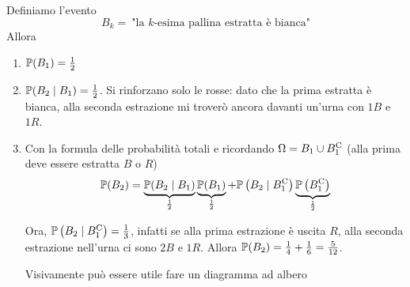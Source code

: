 Definiamo l'evento
\begin{equation*}
B_{k} =\ \text{"la } k\text{-esima pallina estratta è bianca"}
\end{equation*}
Allora
\begin{enumerate}
\item $\mathbb{P}( B_{1}) =\frac{1}{2}$
\item $\mathbb{P}( B_{2} \mid B_{1}) =\frac{1}{2}$. Si rinforzano solo le rosse: dato che la prima estratta è bianca, alla seconda estrazione mi troverò ancora davanti un'urna con $1B$ e $1R$.
\item Con la formula delle probabilità totali e ricordando $\Omega =B_{1} \cup B_{1}^{\mathrm{C}}$ (alla prima deve essere estratta $B$ o $R$)\begin{equation*}
\mathbb{P}( B_{2}) =\underbrace{\mathbb{P}( B_{2} \mid B_{1})}_{\frac{1}{2}}\underbrace{\mathbb{P}( B_{1})}_{\frac{1}{2}} +\mathbb{P}\left( B_{2} \mid B_{1}^{\mathrm{C}}\right)\underbrace{\mathbb{P}\left( B_{1}^{\mathrm{C}}\right)}_{\frac{1}{2}}
\end{equation*}

Ora, $\mathbb{P}\left( B_{2} \mid B_{1}^{\mathrm{C}}\right) =\frac{1}{3}$, infatti se alla prima estrazione è uscita $R$, alla seconda estrazione nell'urna ci sono $2B$ e $1R$. Allora $\mathbb{P}( B_{2}) =\frac{1}{4} +\frac{1}{6} =\frac{5}{12}$.

Visivamente può essere utile fare un diagramma ad albero


\end{enumerate}
